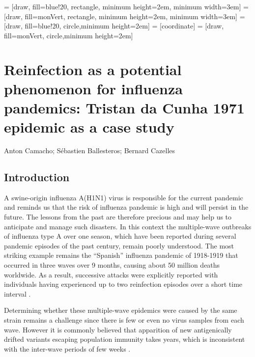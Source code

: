 = [draw, fill=blue!20, rectangle, minimum height=2em, minimum width=3em]
 = [draw, fill=monVert, rectangle, minimum height=2em, minimum width=3em]
 = [draw, fill=blue!20, circle,minimum height=2em]
 = [coordinate]
 = [draw, fill=monVert, circle,minimum height=2em]



\chapter{Reinfection as a potential phenomenon for influenza pandemics: Tristan da Cunha 1971 epidemic as a case study}


Anton Camacho;
Sébastien Ballesteros;
Bernard Cazelles 


\section{Introduction}

A swine-origin influenza A(H1N1) virus is responsible for the current
pandemic and reminds us that the risk of influenza pandemic is high
and will persist in the future. The lessons from the past are
therefore precious and may help us to anticipate and manage such
disasters. In this context the multiple-wave outbreaks of influenza
type A over one season, which have been reported during several
pandemic episodes of the past century, remain poorly understood. The
most striking example remains the ``Spanish'' influenza pandemic of
1918-1919 that occurred in three waves over 9 months, causing about 50
million deaths worldwide. As a result, successive attacks were
explicitly reported with individuals having experienced up to two
reinfection episodes over a short time interval
\citep{Health1920,Dudley1926,Mantle1973,Barry2008}.

Determining whether these multiple-wave epidemics were caused by the
same strain remains a challenge since there is few or even no virus
samples from each wave. However it is commonly believed that
apparition of new antigenically drifted variants escaping population
immunity takes years, which is inconsistent with the inter-wave
periods of few weeks \citep{Taubenberger2006}.


